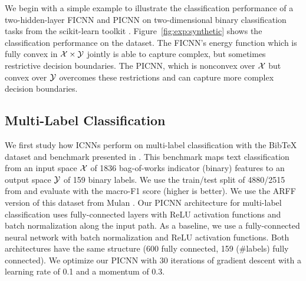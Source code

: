 We begin with a simple example to illustrate the classification performance of a
two-hidden-layer FICNN and PICNN on two-dimensional binary classification
tasks from the scikit-learn toolkit \citep{pedregosa2011scikit}.
Figure~\ref{fig:exp:synthetic} shows the classification performance on the dataset.
The FICNN's energy function which is fully convex in
$\cal{X}\times\cal{Y}$ jointly is able to capture complex,
but sometimes restrictive decision boundaries.
The PICNN, which is nonconvex over $\cal{X}$ but convex over $\cal{Y}$
overcomes these restrictions and can capture more complex decision boundaries.


\subsection{Multi-Label Classification}
We first study how ICNNs perform on multi-label classification with the
BibTeX dataset and benchmark presented in \citet{katakis2008multilabel}.
This benchmark maps text classification from an input space $\cal{X}$ of
1836 bag-of-works indicator (binary) features to an output
space $\cal{Y}$ of 159 binary labels.
We use the train/test split of 4880/2515 from \citep{katakis2008multilabel}
and evaluate with the macro-F1 score (higher is better).
We use the ARFF version of this dataset from Mulan \citep{tsoumakas2011mulan}.
Our PICNN architecture for multi-label classification uses fully-connected
layers with ReLU activation functions and batch
normalization \citep{ioffe2015batch} along the input path.
As a baseline, we use a fully-connected neural network with
batch normalization and ReLU activation functions.
Both architectures have the same structure
(600 fully connected, 159 (\#labels) fully connected).
We optimize our PICNN with 30 iterations of gradient descent
with a learning rate of 0.1 and a momentum of 0.3.

